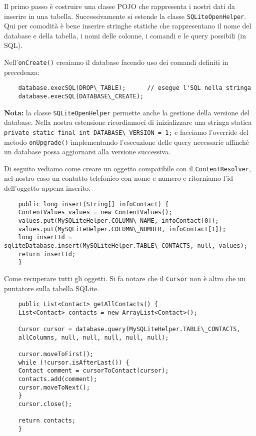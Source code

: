 	Il primo passo è costruire una classe POJO che rappresenta i nostri dati da inserire in una tabella. Successivamente si estende la classe \lstinline|SQLiteOpenHelper|. Qui per comodità è bene inserire stringhe statiche che rappresentano il nome del database e della tabella, i nomi delle colonne, i comandi e le query possibili (in SQL).

	Nell'\lstinline|onCreate()| creaiamo il database facendo uso dei comandi definiti in precedenza:
	\begin{lstlisting}
	database.execSQL(DROP\_TABLE);		// esegue l'SQL nella stringa
	database.execSQL(DATABASE\_CREATE);
	\end{lstlisting}

	\textbf{Nota:} la classe \lstinline|SQLiteOpenHelper| permette anche la gestione della versione del database. Nella nostra estensione ricordiamoci di inizializzare una stringa statica \lstinline|private static final int DATABASE\_VERSION = 1;| e facciamo l'override del metodo \lstinline|onUpgrade()| implementando l'esecuzione delle query necessarie affinché un database possa aggiornarsi alla versione successiva.

	Di seguito vediamo come creare un oggetto compatibile con il \lstinline|ContentResolver|, nel nostro caso un contatto telefonico con nome e numero e ritorniamo l'id dell'oggetto appena inserito.
	\begin{lstlisting}
	public long insert(String[] infoContact) {
	ContentValues values = new ContentValues();
	values.put(MySQLiteHelper.COLUMN\_NAME, infoContact[0]);
	values.put(MySQLiteHelper.COLUMN\_NUMBER, infoContact[1]);
	long insertId = sqliteDatabase.insert(MySQLiteHelper.TABLE\_CONTACTS, null, values);
	return insertId;
	}
	\end{lstlisting}

	Come recuperare tutti gli oggetti. Si fa notare che il \lstinline|Cursor| non è altro che un puntatore sulla tabella SQLite.
	\begin{lstlisting}
	public List<Contact> getAllContacts() {
	List<Contact> contacts = new ArrayList<Contact>();

	Cursor cursor = database.query(MySQLiteHelper.TABLE\_CONTACTS,
	allColumns, null, null, null, null, null);

	cursor.moveToFirst();
	while (!cursor.isAfterLast()) {
	Contact comment = cursorToContact(cursor);
	contacts.add(comment);
	cursor.moveToNext();
	}
	cursor.close();

	return contacts;
	}
	\end{lstlisting}

